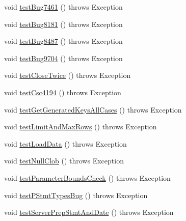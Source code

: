 \begin{DoxyCompactItemize}
\item 
void \mbox{\hyperlink{classtestsuite_1_1regression_1_1_statement_regression_test_a24e32a837cc4669fb18c820b720a2eb8}{test\+Bug7461}} ()  throws Exception 
\item 
void \mbox{\hyperlink{classtestsuite_1_1regression_1_1_statement_regression_test_a41b595b0e3472289f1347ac10199f070}{test\+Bug8181}} ()  throws Exception 
\item 
void \mbox{\hyperlink{classtestsuite_1_1regression_1_1_statement_regression_test_af4aa8a9e2d17d0762f6a5f7fa2373595}{test\+Bug8487}} ()  throws Exception 
\item 
void \mbox{\hyperlink{classtestsuite_1_1regression_1_1_statement_regression_test_a5da35a1c85dea6e6eac135094859b6d2}{test\+Bug9704}} ()  throws Exception 
\item 
void \mbox{\hyperlink{classtestsuite_1_1regression_1_1_statement_regression_test_a4ee424820f3c751235f0082c64575f6a}{test\+Close\+Twice}} ()  throws Exception 
\item 
void \mbox{\hyperlink{classtestsuite_1_1regression_1_1_statement_regression_test_a60a5a676acb160c9ad0bd9a19fd2da5d}{test\+Csc4194}} ()  throws Exception 
\item 
void \mbox{\hyperlink{classtestsuite_1_1regression_1_1_statement_regression_test_af835b8174710f92e6cd0e183a67e2594}{test\+Get\+Generated\+Keys\+All\+Cases}} ()  throws Exception 
\item 
void \mbox{\hyperlink{classtestsuite_1_1regression_1_1_statement_regression_test_ac68c2426cc03a647c5a752e6e2aa5914}{test\+Limit\+And\+Max\+Rows}} ()  throws Exception 
\item 
void \mbox{\hyperlink{classtestsuite_1_1regression_1_1_statement_regression_test_a242b1039d3f6713e99d7512cb905a999}{test\+Load\+Data}} ()  throws Exception 
\item 
void \mbox{\hyperlink{classtestsuite_1_1regression_1_1_statement_regression_test_a42412d8d0c74debc967e563a49d2cd6b}{test\+Null\+Clob}} ()  throws Exception 
\item 
void \mbox{\hyperlink{classtestsuite_1_1regression_1_1_statement_regression_test_a65351d4c69ec3d81977aabf6069fa827}{test\+Parameter\+Bounds\+Check}} ()  throws Exception 
\item 
void \mbox{\hyperlink{classtestsuite_1_1regression_1_1_statement_regression_test_a548c9a5b159033c75ac681a3272558d6}{test\+P\+Stmt\+Types\+Bug}} ()  throws Exception 
\item 
void \mbox{\hyperlink{classtestsuite_1_1regression_1_1_statement_regression_test_a95273398ebb6f8ab8e39d8ab7d7d7ec2}{test\+Server\+Prep\+Stmt\+And\+Date}} ()  throws Exception 

\end{DoxyCompactItemize}
